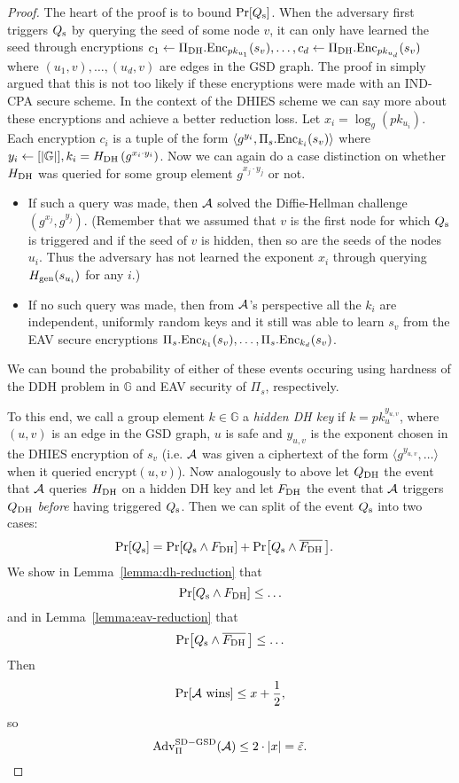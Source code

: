 \begin{proof}
	The heart of the proof is to bound $\pr{\qs}$. When the adversary first triggers $\qs$ by querying the seed of some node $v$, it can only have learned the seed through encryptions $c_1 \from \dhies.\mathrm{Enc}_{pk_{u_1}}(s_v), \ldots, c_d \from \dhies.\mathrm{Enc}_{pk_{u_d}}(s_v)$ where $(u_1, v), \ldots, (u_d, v)$ are edges in the GSD graph. The proof in \cite{ttkem} simply argued that this is not too likely if these encryptions were made with an IND-CPA secure scheme. In the context of the DHIES scheme we can say more about these encryptions and achieve a better reduction loss. Let $x_i = \log_g(pk_{u_i})$. Each encryption $c_i$ is a tuple of the form $\langle g^{y_i}, \Pi_s.\enc_{k_i}(s_v) \rangle$ where $y_i \from [\abs{\mathbb{G}}], k_i = \hdh\left(g^{x_i \cdot y_i}\right)$. Now we can again do a case distinction on whether $\hdh$ was queried for some group element $g^{x_j \cdot y_j}$ or not.
	\begin{itemize}
		\item If such a query was made, then $\adv$ solved the Diffie-Hellman challenge $(g^{x_j}, g^{y_j})$. (Remember that we assumed that $v$ is the first node for which $\qs$ is triggered and if the seed of $v$ is hidden, then so are the seeds of the nodes $u_i$. Thus the adversary has not learned the exponent $x_i$ through querying $\hgen(s_{u_i})$ for any $i$.)
		\item If no such query was made, then from $\adv$'s perspective all the $k_i$ are independent, uniformly random keys and it still was able to learn $s_v$ from the EAV secure encryptions $\Pi_s.\enc_{k_1}(s_v), \ldots, \Pi_s.\enc_{k_d}(s_v)$.
	\end{itemize}
	We can bound the probability of either of these events occuring using hardness of the DDH problem in $\mathbb{G}$ and EAV security of $\Pi_s$, respectively.

	To this end, we call a group element $k \in \mathbb{G}$ a \emph{hidden DH key} if $k = pk_u^{y_{u, v}}$, where $(u, v)$ is an edge in the GSD graph, $u$ is safe and $y_{u, v}$ is the exponent chosen in the DHIES encryption of $s_v$ (i.e. $\adv$ was given a ciphertext of the form $\langle g^{y_{u, v}}, \ldots\rangle$ when it queried $\mathrm{encrypt}(u, v)$). Now analogously to above let $\qdh$ the event that $\adv$ queries $\hdh$ on a hidden DH key and let $\fdh$ the event that $\adv$ triggers $\qdh$ \emph{before} having triggered $\qs$. Then we can split of the event $\qs$ into two cases:
	\begin{align*}
		\pr{\qs} & = \pr{\qs \land \fdh} + \pr{\qs \land \overline{\fdh}\,}.
	\end{align*}
	We show in Lemma~\vref{lemma:dh-reduction} that
	\[
		\pr{\qs \land \fdh} \le \ldots
	\]
	and in Lemma~\vref{lemma:eav-reduction} that
	\[
		\pr{\qs \land \overline{\fdh}\,} \le \ldots
	\]
	Then
	\[
		\pr{\wins} \le x + \frac{1}{2},
	\] so
	\[
		\mathrm{Adv}_{\Pi}^{\mathrm{SD-GSD}}(\adv) \le 2 \cdot \abs*{x} = \tilde{\epsilon}.
	\]
\end{proof}

